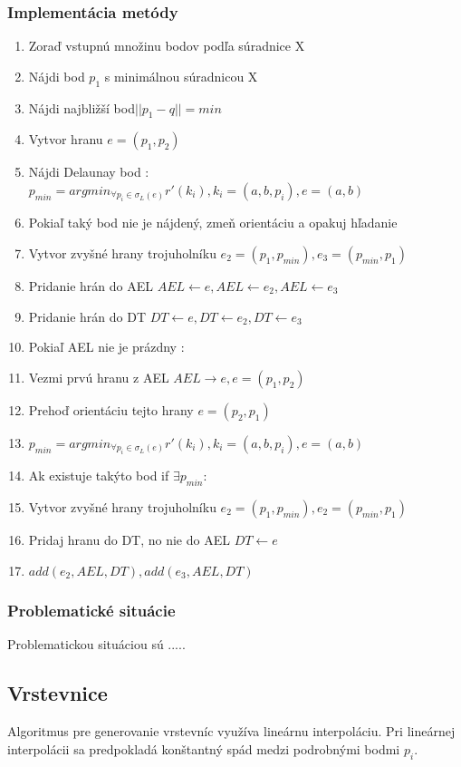 \documentclass[12pt]{article}
\begin{document}
\subsubsection{Implementácia metódy}

\begin{enumerate}
\item Zoraď vstupnú množinu bodov podľa súradnice X
\item Nájdi bod $p_1$ s minimálnou súradnicou X 
\item Nájdi najbližší bod$ ||p_1-q|| = min $ 
\item Vytvor hranu $ e = (p_1,p_2) $ 
\item  Nájdi Delaunay bod :  $p_{min} = arg min_{\forall p_i\in\sigma_L(e)} r'(k_i), k_i = (a, b, p_i), e = (a,b)$
\item \hspace {1.5cm} Pokiaľ taký bod nie je nájdený, zmeň orientáciu a opakuj hľadanie
\item Vytvor zvyšné hrany trojuholníku $e_2 = (p_1,p_{min}), e_3 = (p_{min},p_1) $
\item  Pridanie hrán do AEL $ AEL \leftarrow e, AEL  \gets e_2,  AEL \gets e_3 $
\item  Pridanie hrán do DT $ DT \gets e, DT \gets e_2,  DT \gets e_3 $
\item  Pokiaľ AEL nie je prázdny :
\item \hspace {1cm} Vezmi prvú hranu z	 AEL $AEL  \longrightarrow e, e = ( p_1, p_2) $
\item \hspace {1cm} Prehoď orientáciu tejto hrany $ e = (p_2, p_1)$ 
\item \hspace {1cm} $p_{min} = arg min_{\forall p_i\in\sigma_L(e)} r'(k_i), k_i = (a, b, p_i), e = (a,b) $
\item \hspace {1cm} Ak existuje takýto bod if $ \exists p_{min}:$
\item \hspace {1.5cm} Vytvor zvyšné hrany trojuholníku $e_2 = (p_1,p_{min}), e_2 = (p_{min},p_1)  $
\item \hspace {1.5cm} Pridaj hranu do DT, no nie do AEL $DT \longleftarrow e  $  
\item \hspace {1.5cm} $ add(e_2,AEL,DT), add(e_3,AEL,DT)$
\end{enumerate}

\subsubsection {Problematické situácie}
Problematickou situáciou sú .....

\subsection {Vrstevnice}
Algoritmus pre generovanie vrstevníc využíva lineárnu interpoláciu. Pri lineárnej interpolácii sa predpokladá konštantný spád medzi podrobnými bodmi $p_i$.
\end{document}
